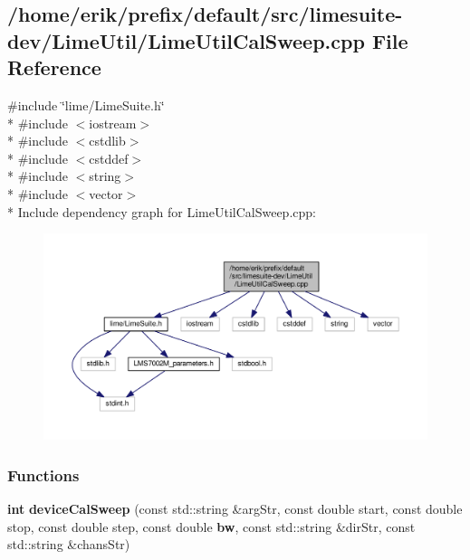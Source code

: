 \subsection{/home/erik/prefix/default/src/limesuite-\/dev/\+Lime\+Util/\+Lime\+Util\+Cal\+Sweep.cpp File Reference}
\label{LimeUtilCalSweep_8cpp}
{\ttfamily \#include \char`\"{}lime/\+Lime\+Suite.\+h\char`\"{}}\\*
{\ttfamily \#include $<$iostream$>$}\\*
{\ttfamily \#include $<$cstdlib$>$}\\*
{\ttfamily \#include $<$cstddef$>$}\\*
{\ttfamily \#include $<$string$>$}\\*
{\ttfamily \#include $<$vector$>$}\\*
Include dependency graph for Lime\+Util\+Cal\+Sweep.\+cpp\+:
\nopagebreak
\begin{figure}[H]
\begin{center}
\leavevmode
\includegraphics[width=350pt]{d1/db4/LimeUtilCalSweep_8cpp__incl}
\end{center}
\end{figure}
\subsubsection*{Functions}
\begin{DoxyCompactItemize}
\item 
{\bf int} {\bf device\+Cal\+Sweep} (const std\+::string \&arg\+Str, const double start, const double stop, const double step, const double {\bf bw}, const std\+::string \&dir\+Str, const std\+::string \&chans\+Str)
\end{DoxyCompactItemize}


